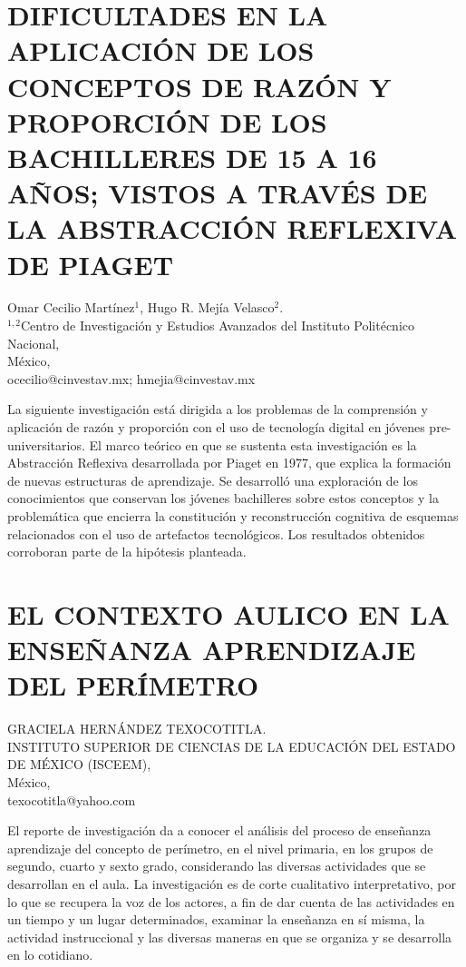 \section{DIFICULTADES EN LA APLICACIÓN DE LOS CONCEPTOS DE RAZÓN Y PROPORCIÓN
DE LOS BACHILLERES DE 15 A 16 AÑOS; VISTOS A TRAVÉS DE LA ABSTRACCIÓN
REFLEXIVA DE PIAGET}

\begin{datos}
Omar Cecilio Martínez$^1$, Hugo R. Mejía Velasco$^2$.\\
$^{1,2}$Centro de Investigación y Estudios Avanzados del Instituto Politécnico Nacional,\\
\hfill   México, \\
\hfill ocecilio@cinvestav.mx; hmejia@cinvestav.mx
\end{datos}

La siguiente investigación está dirigida a los problemas de la comprensión
y aplicación de razón y proporción con el uso de tecnología digital
en jóvenes pre-universitarios. El marco teórico en que se sustenta
esta investigación es la Abstracción Reflexiva desarrollada por Piaget
en 1977, que explica la formación de nuevas estructuras de aprendizaje.
Se desarrolló una exploración de los conocimientos que conservan los
jóvenes bachilleres sobre estos conceptos y la problemática que encierra
la constitución y reconstrucción cognitiva de esquemas relacionados
con el uso de artefactos tecnológicos. Los resultados obtenidos corroboran
parte de la hipótesis planteada.


\section{EL CONTEXTO AULICO EN LA ENSEÑANZA APRENDIZAJE DEL PERÍMETRO}

\begin{datos}
GRACIELA HERNÁNDEZ TEXOCOTITLA.\\
INSTITUTO SUPERIOR DE CIENCIAS DE LA EDUCACIÓN DEL ESTADO DE MÉXICO (ISCEEM),\\
\hfill   México, \\
\hfill texocotitla@yahoo.com
\end{datos}

El reporte de investigación da a conocer el análisis del proceso de
enseñanza aprendizaje del concepto de perímetro, en el nivel primaria,
en los grupos de segundo, cuarto y sexto grado, considerando las diversas
actividades que se desarrollan en el aula. La investigación es de
corte cualitativo interpretativo, por lo que se recupera la voz de
los actores, a fin de dar cuenta de las actividades en un tiempo y
un lugar determinados, examinar la enseñanza en sí misma, la actividad
instruccional y las diversas maneras en que se organiza y se desarrolla
en lo cotidiano.


